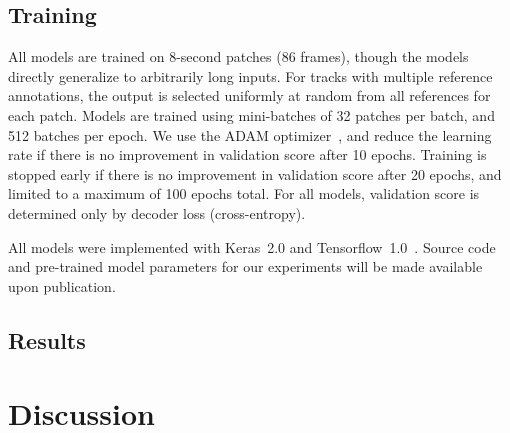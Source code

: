 \documentclass{article}
\begin{document}
\subsection{Training}
All models are trained on 8-second patches (86 frames), though the models directly generalize to arbitrarily long inputs.
For tracks with multiple reference annotations, the output is selected uniformly at random from all references for each patch.
Models are trained using mini-batches of 32 patches per batch, and 512 batches per epoch.
We use the ADAM optimizer~\cite{kingma2014adam}, and reduce the learning rate if there is no improvement in validation score after 10 epochs.
Training is stopped early if there is no improvement in validation score after 20 epochs, and limited to a maximum of 100 epochs total.
For all models, validation score is determined only by decoder loss (cross-entropy).


All models were implemented with Keras~2.0 and Tensorflow~1.0~\cite{chollet2015keras, tensorflow2015-whitepaper}.
Source code and pre-trained model parameters for our experiments will be made available upon publication.

\subsection{Results}

\section{Discussion}



\end{document}
